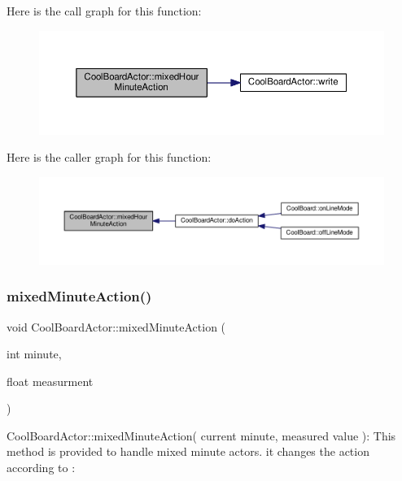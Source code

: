 Here is the call graph for this function\+:\nopagebreak
\begin{figure}[H]
\begin{center}
\leavevmode
\includegraphics[width=350pt]{dc/d69/class_cool_board_actor_ae6b2a17b0e73cfeb353ded2cc4e08109_cgraph}
\end{center}
\end{figure}
Here is the caller graph for this function\+:\nopagebreak
\begin{figure}[H]
\begin{center}
\leavevmode
\includegraphics[width=350pt]{dc/d69/class_cool_board_actor_ae6b2a17b0e73cfeb353ded2cc4e08109_icgraph}
\end{center}
\end{figure}
\mbox{\label{class_cool_board_actor_a2b8a79a27288d5246e3e3860ae76770d}} 
\subsubsection{\texorpdfstring{mixed\+Minute\+Action()}{mixedMinuteAction()}}
{\footnotesize\ttfamily void Cool\+Board\+Actor\+::mixed\+Minute\+Action (\begin{DoxyParamCaption}\item[{int}]{minute,  }\item[{float}]{measurment }\end{DoxyParamCaption})}

Cool\+Board\+Actor\+::mixed\+Minute\+Action( current minute, measured value )\+: This method is provided to handle mixed minute actors. it changes the action according to \+:

